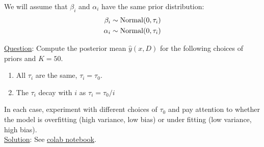 \begin{itemize}
\begin{example}
We will assume that $\beta_i$ and $\alpha_i$ have the same prior distribution: 
\begin{align*}
\beta_i \sim {\rm Normal}(0,\tau_i)\\
\alpha_i \sim {\rm Normal}(0,\tau_i)\\
\end{align*}

\noindent 
\underline{Question}: 
Compute the posterior mean $\hat{y}(x,D)$ for the following choices of priors and $K=50$. 
\begin{enumerate}[label=(\alph*)]
\item All $\tau_i$ are the same, $\tau_i = \tau_0$. 
\item The $\tau_i$ decay with $i$ as $\tau_i = \tau_0/i$
\end{enumerate}
In each case, experiment with different choices of $\tau_0$ and pay attention to whether the model is overfitting (high variance, low bias) or under fitting (low variance, high bias). \\


\noindent 
\underline{Solution}: See  \href{https://colab.research.google.com/drive/1sFlY0nvo7hrsNYGRdx8C4tKPihyOSmbx?usp=sharing}{colab notebook}. 


 
\end{example}

\end{itemize}


